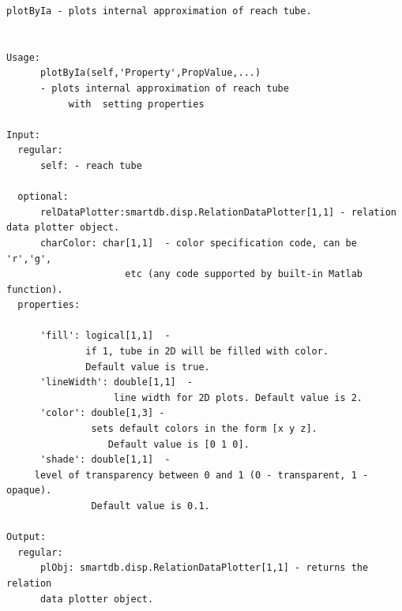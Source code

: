 \documentclass[letterpaper,10pt,english]{sphinxmanual}
\begin{document}
\begin{Verbatim}[commandchars=\\\{\}]
plotByIa - plots internal approximation of reach tube.


Usage:
      plotByIa(self,'Property',PropValue,...)
      - plots internal approximation of reach tube
           with  setting properties

Input:
  regular:
      self: - reach tube

  optional:
      relDataPlotter:smartdb.disp.RelationDataPlotter[1,1] - relation data plotter object.
      charColor: char[1,1]  - color specification code, can be 'r','g',
                     etc (any code supported by built-in Matlab function).
  properties:

      'fill': logical[1,1]  -
              if 1, tube in 2D will be filled with color.
              Default value is true.
      'lineWidth': double[1,1]  -
                   line width for 2D plots. Default value is 2.
      'color': double[1,3] -
               sets default colors in the form [x y z].
                  Default value is [0 1 0].
      'shade': double[1,1]  -
     level of transparency between 0 and 1 (0 - transparent, 1 - opaque).
               Default value is 0.1.

Output:
  regular:
      plObj: smartdb.disp.RelationDataPlotter[1,1] - returns the relation
      data plotter object.
\end{Verbatim}
\end{document}
